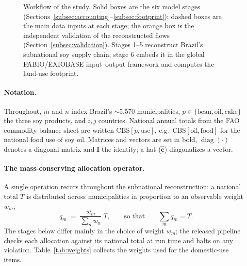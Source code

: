 \documentclass[pdflatex,sn-nature]{sn-jnl}%
\DeclareMathOperator{\diag}{diag}
\newcommand{\CBS}[2]{\mathrm{CBS}[#1,#2]}
\begin{document}
\begin{figure}[htbp]
\caption{Workflow of the study. Solid boxes are the six model stages
(Sections~\ref{subsec:accounting}--\ref{subsec:footprint}); dashed boxes are
the main data inputs at each stage; the orange box is the independent
validation of the reconstructed flows (Section~\ref{subsec:validation}).
Stages 1--5 reconstruct Brazil's subnational soy supply chain; stage 6 embeds
it in the global FABIO/EXIOBASE input--output framework and computes the
land-use footprint.}\label{fig:workflow}
\end{figure}

\paragraph{Notation.}
Throughout, $m$ and $n$ index Brazil's $\sim$5{,}570 municipalities,
$p\in\{\text{bean},\text{oil},\text{cake}\}$ the three soy products, and
$i,j$ countries. National annual totals from the FAO commodity balance sheet
are written $\CBS{p}{\text{use}}$, e.g.\ $\CBS{\text{oil}}{\text{food}}$
for the national food use of soy oil. Matrices and vectors are set in bold,
$\diag(\cdot)$ denotes a diagonal matrix and $\mathbf{I}$ the identity; a hat
($\hat{\mathbf{e}}$) diagonalizes a vector.

\paragraph{The mass-conserving allocation operator.}
A single operation recurs throughout the subnational reconstruction: a
national total $T$ is distributed across municipalities in proportion to an
observable weight $w_m$,
\begin{equation}\label{eq:split}
  q_m \;=\; \frac{w_m}{\sum_{n}w_{n}}\;T,
  \qquad\text{so that}\qquad \sum_m q_m = T .
\end{equation}
The stages below differ mainly in the choice of weight $w_m$; the released
pipeline checks each allocation against its national total at run time and
halts on any violation. Table~\ref{tab:weights}
collects the weights used for the domestic-use items.
\end{document}
